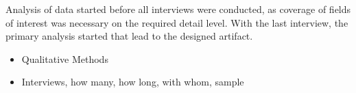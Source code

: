 	Analysis of data started before all interviews were conducted, as coverage of fields of interest was necessary on the required detail level. With the last interview, the primary analysis started that lead to the designed artifact.
	
	
		\begin{itemize}
			\item Qualitative Methods
			\item Interviews, how many, how long, with whom, sample
			
		\end{itemize}
	
